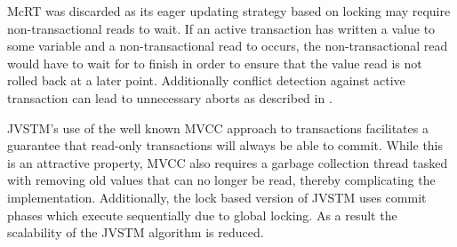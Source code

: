 McRT was discarded as its eager updating strategy based on locking may require non-transactional reads to wait. If an active transaction  has written a value to some variable  and a non-transactional read to  occurs, the non-transactional read would have to wait for  to finish in order to ensure that the value read is not rolled back at a later point. Additionally conflict detection against active transaction can lead to unnecessary aborts as described in .

JVSTM's use of the well known \ac{MVCC} approach to transactions facilitates a guarantee that read-only transactions will always be able to commit. While this is an attractive property, \ac{MVCC} also requires a garbage collection thread tasked with removing old values that can no longer be read, thereby complicating the implementation. Additionally, the lock based version of JVSTM uses commit phases which execute sequentially due to global locking. As a result the scalability of the  JVSTM algorithm is reduced\cite[p. 86]{cachopo2007development}. 




